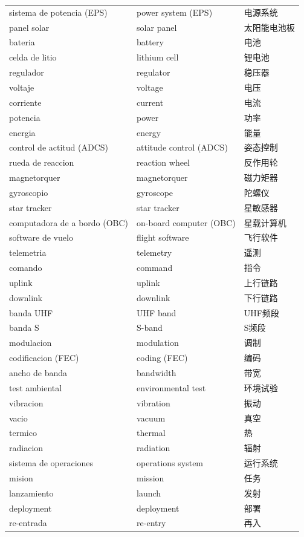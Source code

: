 \documentclass[11pt,a4paper]{report}
\begin{document}
\begin{center}
\begin{longtable}{p{4cm}p{4cm}p{4.5cm}}
sistema de potencia (EPS) & power system (EPS) & 电源系统 \\
panel solar & solar panel & 太阳能电池板 \\
bateria & battery & 电池 \\
celda de litio & lithium cell & 锂电池 \\
regulador & regulator & 稳压器 \\
voltaje & voltage & 电压 \\
corriente & current & 电流 \\
potencia & power & 功率 \\
energia & energy & 能量 \\
control de actitud (ADCS) & attitude control (ADCS) & 姿态控制 \\
rueda de reaccion & reaction wheel & 反作用轮 \\
magnetorquer & magnetorquer & 磁力矩器 \\
gyroscopio & gyroscope & 陀螺仪 \\
star tracker & star tracker & 星敏感器 \\
computadora de a bordo (OBC) & on-board computer (OBC) & 星载计算机 \\
software de vuelo & flight software & 飞行软件 \\
telemetria & telemetry & 遥测 \\
comando & command & 指令 \\
uplink & uplink & 上行链路 \\
downlink & downlink & 下行链路 \\
banda UHF & UHF band & UHF频段 \\
banda S & S-band & S频段 \\
modulacion & modulation & 调制 \\
codificacion (FEC) & coding (FEC) & 编码 \\
ancho de banda & bandwidth & 带宽 \\
test ambiental & environmental test & 环境试验 \\
vibracion & vibration & 振动 \\
vacio & vacuum & 真空 \\
termico & thermal & 热 \\
radiacion & radiation & 辐射 \\
sistema de operaciones & operations system & 运行系统 \\
mision & mission & 任务 \\
lanzamiento & launch & 发射 \\
deployment & deployment & 部署 \\
re-entrada & re-entry & 再入 \\
\bottomrule
\end{longtable}
\end{center}
\end{document}
